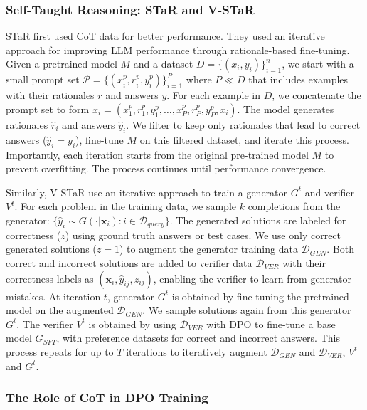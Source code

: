 \subsubsection{Self-Taught Reasoning: STaR and V-STaR}

STaR \autocite{zelikman2022starbootstrappingreasoningreasoning} first used CoT data for better performance. They used an iterative approach for improving LLM performance through rationale-based fine-tuning. Given a pretrained model $M$ and a dataset $D = \{(x_i, y_i)\}_{i=1}^n$, we start with a small prompt set $\mathcal{P} = \{(x_i^p, r_i^p, y_i^p)\}_{i=1}^P$ where $P \ll D$ that includes examples with their rationales $r$ and answers $y$. For each example in $D$, we concatenate the prompt set to form $x_i = (x_1^p, r_1^p, y_1^p, \ldots, x_P^p, r_P^p, y_P^p, x_i)$. The model generates rationales $\hat{r}_i$ and answers $\hat{y}_i$. We filter to keep only rationales that lead to correct answers ($\hat{y}_i = y_i$), fine-tune $M$ on this filtered dataset, and iterate this process. Importantly, each iteration starts from the original pre-trained model $M$ to prevent overfitting. The process continues until performance convergence.

Similarly, V-STaR \autocite{hosseini2024vstartrainingverifiersselftaught} use an iterative approach to train a generator $G^t$ and verifier $V^t$. For each problem in the training data, we sample $k$ completions from the generator: $\{\hat{y}_i \sim G(\cdot|\mathbf{x}_i): i \in \mathcal{D}_{query}\}$. The generated solutions are labeled for correctness ($z$) using ground truth answers or test cases. We use only correct generated solutions ($z=1$) to augment the generator training data $\mathcal{D}_{GEN}$. Both correct and incorrect solutions are added to verifier data $\mathcal{D}_{VER}$ with their correctness labels as $(\mathbf{x}_i, \hat{y}_{ij}, z_{ij})$, enabling the verifier to learn from generator mistakes. At iteration $t$, generator $G^t$ is obtained by fine-tuning the pretrained model on the augmented $\mathcal{D}_{GEN}$. We sample solutions again from this generator $G^t$. The verifier $V^t$ is obtained by using $\mathcal{D}_{VER}$ with DPO to fine-tune a base model $G_{SFT}$, with preference datasets for correct and incorrect answers. This process repeats for up to $T$ iterations to iteratively augment $\mathcal{D}_{GEN}$ and $\mathcal{D}_{VER}$, $V^t$ and $G^t$.

\subsubsection{The Role of CoT in DPO Training}

